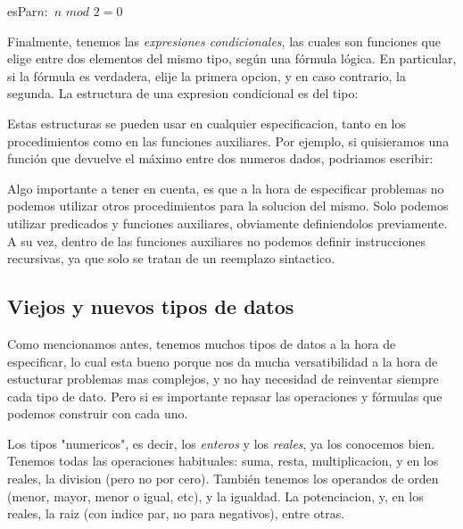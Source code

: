 \documentclass{article}
\begin{document}
\begin{pred}{esPar}{$n:$\ent} $n$ $mod$ $2 = 0$ \end{pred}

Finalmente, tenemos las \textit{expresiones condicionales}, las cuales son funciones que elige entre dos elementos del mismo tipo, según una fórmula lógica. En particular, si la fórmula es verdadera, elije la primera opcion, y en caso contrario, la segunda. La estructura de una expresion condicional es del tipo:


Estas estructuras se pueden usar en cualquier especificacion, tanto en los procedimientos como en las funciones auxiliares. Por ejemplo, si quisieramos una función que devuelve el máximo entre dos numeros dados, podriamos escribir:

\begin{center}
\end{center}

Algo importante a tener en cuenta, es que a la hora de especificar problemas no podemos utilizar otros procedimientos para la solucion del mismo. Solo podemos utilizar predicados y funciones auxiliares, obviamente definiendolos previamente. A su vez, dentro de las funciones auxiliares no podemos definir instrucciones recursivas, ya que solo se tratan de un reemplazo sintactico.

\subsection{Viejos y nuevos tipos de datos}

Como mencionamos antes, tenemos muchos tipos de datos a la hora de especificar, lo cual esta bueno porque nos da mucha versatibilidad a la hora de estucturar problemas mas complejos, y no hay necesidad de reinventar siempre cada tipo de dato. Pero si es importante repasar las operaciones y fórmulas que podemos construir con cada uno.

Los tipos "numericos", es decir, los \textit{enteros} y los \textit{reales}, ya los conocemos bien. Tenemos todas las operaciones habituales: suma, resta, multiplicacion, y en los reales, la division (pero no por cero). También tenemos los operandos de orden (menor, mayor, menor o igual, etc), y la igualdad. La potenciacion, y, en los reales, la raiz (con indice par, no para negativos), entre otras.
\end{document}
